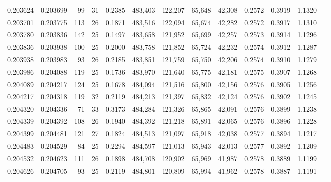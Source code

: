 \begin{tabular}{rrrrrrrrrrrrr}
0.203624 & 0.203699 &  99 &  31 &                                     0.2385 & 483,403 & 122,207 &  65,648 &  42,308 & 0.2572 & 0.3919 & 1.1320 \\
0.203701 & 0.203775 & 113 &  26 &                                     0.1871 & 483,516 & 122,094 &  65,674 &  42,282 & 0.2572 & 0.3917 & 1.1310 \\
0.203780 & 0.203836 & 142 &  25 &                                     0.1497 & 483,658 & 121,952 &  65,699 &  42,257 & 0.2573 & 0.3914 & 1.1296 \\
0.203836 & 0.203938 & 100 &  25 &                                     0.2000 & 483,758 & 121,852 &  65,724 &  42,232 & 0.2574 & 0.3912 & 1.1287 \\
0.203938 & 0.203983 &  93 &  26 &                                     0.2185 & 483,851 & 121,759 &  65,750 &  42,206 & 0.2574 & 0.3910 & 1.1279 \\
0.203986 & 0.204088 & 119 &  25 &                                     0.1736 & 483,970 & 121,640 &  65,775 &  42,181 & 0.2575 & 0.3907 & 1.1268 \\
0.204089 & 0.204217 & 124 &  25 &                                     0.1678 & 484,094 & 121,516 &  65,800 &  42,156 & 0.2576 & 0.3905 & 1.1256 \\
0.204217 & 0.204318 & 119 &  32 &                                     0.2119 & 484,213 & 121,397 &  65,832 &  42,124 & 0.2576 & 0.3902 & 1.1245 \\
0.204320 & 0.204336 &  71 &  33 &                                     0.3173 & 484,284 & 121,326 &  65,865 &  42,091 & 0.2576 & 0.3899 & 1.1238 \\
0.204339 & 0.204392 & 108 &  26 &                                     0.1940 & 484,392 & 121,218 &  65,891 &  42,065 & 0.2576 & 0.3896 & 1.1228 \\
0.204399 & 0.204481 & 121 &  27 &                                     0.1824 & 484,513 & 121,097 &  65,918 &  42,038 & 0.2577 & 0.3894 & 1.1217 \\
0.204483 & 0.204529 &  84 &  25 &                                     0.2294 & 484,597 & 121,013 &  65,943 &  42,013 & 0.2577 & 0.3892 & 1.1209 \\
0.204532 & 0.204623 & 111 &  26 &                                     0.1898 & 484,708 & 120,902 &  65,969 &  41,987 & 0.2578 & 0.3889 & 1.1199 \\
0.204626 & 0.204705 &  93 &  25 &                                     0.2119 & 484,801 & 120,809 &  65,994 &  41,962 & 0.2578 & 0.3887 & 1.1191 \\

\end{tabular}
